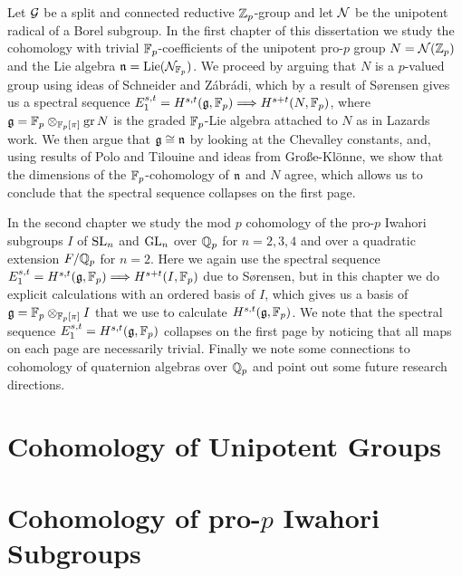 \documentclass[letterpaper,oneside,english,11pt,openany]{memoir}
\begin{document}
Let $\mathcal{G}$ be a split and connected reductive $\mathbb{Z}_{p}$-group and let $\mathcal{N}$ be the unipotent radical of a Borel subgroup. In the first chapter of this dissertation we study the cohomology with trivial $\mathbb{F}_{p}$-coefficients of the unipotent pro-$p$ group $N = \mathcal{N}(\mathbb{Z}_{p})$ and the Lie algebra $\mathfrak{n} = \operatorname{Lie}(\mathcal{N}_{\mathbb{F}_{p}})$. We proceed by arguing that $N$ is a $p$-valued group using ideas of Schneider and Zábrádi, which by a result of Sørensen gives us a spectral sequence $E_{1}^{s,t} = H^{s,t}(\mathfrak{g},\mathbb{F}_{p}) \Longrightarrow H^{s+t}(N,\mathbb{F}_{p})$, where $\mathfrak{g} = \mathbb{F}_{p} \otimes_{\mathbb{F}_{p}[\pi]} \operatorname{gr} N$ is the graded $\mathbb{F}_{p}$-Lie algebra attached to $N$ as in Lazards work. We then argue that $\mathfrak{g} \cong \mathfrak{n}$ by looking at the Chevalley constants, and, using results of Polo and Tilouine and ideas from Große-Klönne, we show that the dimensions of the $\mathbb{F}_{p}$-cohomology of $\mathfrak{n}$ and $N$ agree, which allows us to conclude that the spectral sequence collapses on the first page.

In the second chapter we study the mod $p$ cohomology of the pro-$p$ Iwahori subgroups $I$ of $\operatorname{SL}_{n}$ and $\operatorname{GL}_{n}$ over $\mathbb{Q}_{p}$ for $n=2,3,4$ and over a quadratic extension $F/\mathbb{Q}_{p}$ for $n=2$. Here we again use the spectral sequence $E_{1}^{s,t} = H^{s,t}(\mathfrak{g},\mathbb{F}_{p}) \Longrightarrow H^{s+t}(I,\mathbb{F}_{p})$ due to Sørensen, but in this chapter we do explicit calculations with an ordered basis of $I$, which gives us a basis of $\mathfrak{g} = \mathbb{F}_{p} \otimes_{\mathbb{F}_{p}[\pi]} I$ that we use to calculate $H^{s,t}(\mathfrak{g},\mathbb{F}_{p})$. We note that the spectral sequence $E_{1}^{s,t} = H^{s,t}(\mathfrak{g},\mathbb{F}_{p})$ collapses on the first page by noticing that all maps on each page are necessarily trivial. Finally we note some connections to cohomology of quaternion algebras over $\mathbb{Q}_{p}$ and point out some future research directions.

\clearpage

\mainmatter

\pagestyle{ruled}



\chapter{Cohomology of Unipotent Groups}%
\label{cha:cohunigps}



\chapter{Cohomology of pro-\texorpdfstring{$p$}{p} Iwahori Subgroups}%
\label{cha:cohiwagps}
\end{document}
